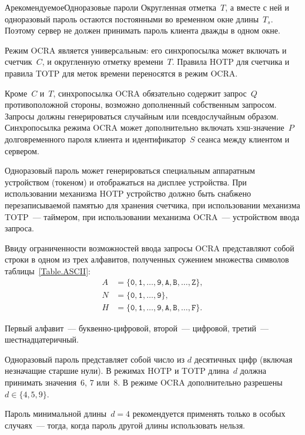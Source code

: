 \begin{appendix}{А}{рекомендуемое}{Одноразовые пароли}
Округленная отметка~$T$, а вместе с ней и одноразовый пароль
остаются постоянными во временном окне длины~$T_s$.
Поэтому сервер не должен принимать пароль клиента 
дважды в одном окне. 

Режим OCRA является универсальным:
его синхропосылка может включать и счетчик~$C$, и округленную 
отметку времени~$T$. Правила HOTP для счетчика
и правила TOTP для меток времени переносятся в режим OCRA.

Кроме~$C$ и~$T$, синхропосылка OCRA обязательно содержит запрос~$Q$ 
противоположной стороны, возможно дополненный собственным
запросом. 
%
Запросы должны генерироваться случайным или псевдослучайным образом.
%
Синхропосылка режима OCRA может дополнительно включать 
хэш-значение~$P$ долговременного пароля клиента
и идентификатор~$S$ сеанса между клиентом и сервером.

Одноразовый пароль может генерироваться специальным аппаратным 
устройством (токеном) и отображаться на дисплее устройства.
%
При использовании механизма HOTP устройство должно быть снабжено
перезаписываемой памятью для хранения счетчика,
при использовании механизма TOTP~--- таймером,
при использовании механизма OCRA~--- 
устройством ввода запроса.

Ввиду ограниченности возможностей ввода 
запросы OCRA представляют собой строки в одном из трех алфавитов,
полученных сужением множества символов таблицы~\ref{Table.ASCII}:
\begin{align*}
A&=\{
\texttt{0},\texttt{1},\ldots,\texttt{9},
\texttt{A},\texttt{B},\ldots,\texttt{Z}\},\\
N&=\{
\texttt{0},\texttt{1},\ldots,\texttt{9}\},\\
H&=\{
\texttt{0},\texttt{1},\ldots,\texttt{9},
\texttt{A},\texttt{B},\ldots,\texttt{F}\}.
\end{align*}

Первый алфавит~--- буквенно-цифровой,
второй~--- цифровой, третий~--- шестнадцатеричный.


Одноразовый пароль представляет собой число из $d$ десятичных цифр
(включая незначащие старшие нули).
%
В режимах HOTP и TOTP длина~$d$ должна принимать значения~$6$, $7$ или~$8$.
В режиме OCRA дополнительно разрешены~$d\in\{4,5,9\}$. 

Пароль минимальной длины~$d=4$ рекомендуется применять 
только в особых случаях~--- тогда, когда пароль другой длины 
использовать нельзя.



\end{appendix}
